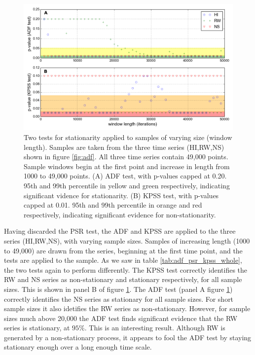 \newpage

\begin{figure}[h!]
	\centering
	\includegraphics[width=0.80\linewidth]{"./chapters/chapter04b/figures/Rtests/stat_tests_v_wl"}
     \caption{Two tests for stationarity applied to samples of varying size (window length). Samples are taken from the three time series (HI,RW,NS) shown in figure \ref{fig:adf}. All three time series contain 49,000 points. Sample windows begin at the first point and increase in length from 1000 to 49,000 points. (A) ADF test, with p-values capped at 0.20. 95th and 99th percentile in yellow and green respectively, indicating significant vidence for stationarity. (B) KPSS test, with p-values capped at 0.01. 95th and 99th percentile in orange and red respectively, indicating significant evidence for non-stationarity.} 
     \label{fig:stat_tests_v_wl}   
\end{figure}

Having discarded the PSR test, the ADF and KPSS are applied to the three series (HI,RW,NS), with varying sample sizes. Samples of increasing length (1000 to 49,000) are drawn from the series, beginning at the first time point, and the tests are applied to the sample. As we saw in table \ref{tab:adf_psr_kpss_whole}, the two tests again to perform differently. The KPSS test correctly identifies the RW and NS series as non-stationary and stationary respectively, for all sample sizes. This is shown in panel B of figure \ref{fig:stat_tests_v_wl}. The ADF test (panel A figure \ref{fig:stat_tests_v_wl}) correctly identifies the NS series as stationary for all sample sizes.  For short sample sizes it also idetifies the RW series as non-stationary. However, for sample sizes much above 20,000 the ADF test finds significant evidence that the RW series is stationary, at $95\%$. This is an interesting result. Although RW is generated by a non-stationary process, it appears to fool the ADF test by staying stationary enough over a long enough time scale. 
  
